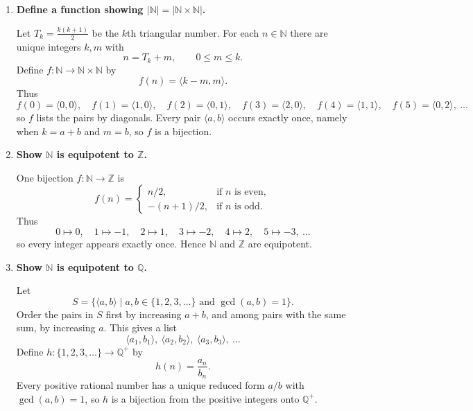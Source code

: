 \documentclass[11pt,openany]{book}
\def\NN{\mathbb{N}}
\def\ZN{\mathbb{Z}}
\def\QN{\mathbb{Q}}
\begin{document}
\begin{enumerate}[{0.}1. ]
\begin{enumerate}
\item \textit{Reflexive}: $\mathrm{id}_A: A\to A$ is a bijection, so $A\sim A$.
\item \textit{Symmetric}: If $f: A\to B$ is a bijection, then $f^{-1}: B\to A$ is also a bijection.
\item \textit{Transitive}: If $f: A\to B$ and $g: B\to C$ are bijections, then $g\circ f: A\to C$ is a bijection.
\end{enumerate}

\item \textbf{Define a function showing $|\NN|=|\NN\times\NN|$.}

Let $T_k=\frac{k(k+1)}{2}$ be the $k$th triangular number. For each $n\in\NN$
there are unique integers $k,m$ with
\[
n=T_k+m,\qquad 0\le m\le k.
\]
Define $f:\NN\to\NN\times\NN$ by
\[
f(n)=\langle k-m,m\rangle.
\]
Thus
\[
f(0)=\langle 0,0\rangle,\quad
f(1)=\langle 1,0\rangle,\quad
f(2)=\langle 0,1\rangle,\quad
f(3)=\langle 2,0\rangle,\quad
f(4)=\langle 1,1\rangle,\quad
f(5)=\langle 0,2\rangle,\ \ldots
\]
so $f$ lists the pairs by diagonals. Every pair $\langle a,b\rangle$ occurs exactly
once, namely when $k=a+b$ and $m=b$, so $f$ is a bijection.

\item \textbf{Show $\NN$ is equipotent to $\ZN$.}

One bijection $f:\NN\to\ZN$ is
\[
f(n)=
\begin{cases}
n/2, & \text{if $n$ is even},\\
-(n+1)/2, & \text{if $n$ is odd}.
\end{cases}
\]
Thus
\[
0\mapsto 0,\quad 1\mapsto -1,\quad 2\mapsto 1,\quad 3\mapsto -2,\quad
4\mapsto 2,\quad 5\mapsto -3,\ \ldots
\]
so every integer appears exactly once. Hence $\NN$ and $\ZN$ are equipotent.

\item \textbf{Show $\NN$ is equipotent to $\QN$.}

Let
\[
S=\{\langle a,b\rangle \mid a,b\in\{1,2,3,\ldots\}\text{ and }\gcd(a,b)=1\}.
\]
Order the pairs in $S$ first by increasing $a+b$, and among pairs with the same
sum, by increasing $a$. This gives a list
\[
\langle a_1,b_1\rangle,\ \langle a_2,b_2\rangle,\ \langle a_3,b_3\rangle,\ \ldots
\]
Define $h:\{1,2,3,\ldots\}\to\QN^+$ by
\[
h(n)=\frac{a_n}{b_n}.
\]
Every positive rational number has a unique reduced form $a/b$ with
$\gcd(a,b)=1$, so $h$ is a bijection from the positive integers onto $\QN^+$.


\end{enumerate}
\end{document}
